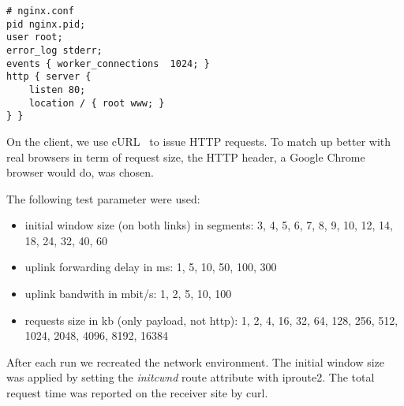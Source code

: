 \begin{lstlisting}
# nginx.conf
pid nginx.pid;
user root;
error_log stderr;
events { worker_connections  1024; }
http { server {
    listen 80;
    location / { root www; }
} }
\end{lstlisting}

On the client, we use cURL~\cite{curl} to issue HTTP requests. To match up
better with real browsers in term of request size, the HTTP header, a Google
Chrome browser would do, was chosen.

The following test parameter were used:

\begin{itemize}
  \item initial window size (on both links) in segments: 3, 4, 5, 6, 7, 8, 9, 10, 12, 14, 18, 24, 32, 40, 60
  \item uplink forwarding delay in ms: 1, 5, 10, 50, 100, 300
  \item uplink bandwith in mbit/s: 1, 2, 5, 10, 100
  \item requests size in kb (only payload, not http): 1, 2, 4, 16, 32, 64, 128, 256, 512, 1024, 2048, 4096, 8192, 16384
\end{itemize}

After each run we recreated the network environment. The initial window size was
applied by setting the \emph{initcwnd} route attribute with iproute2. The total
request time was reported on the receiver site by curl.



%
%
